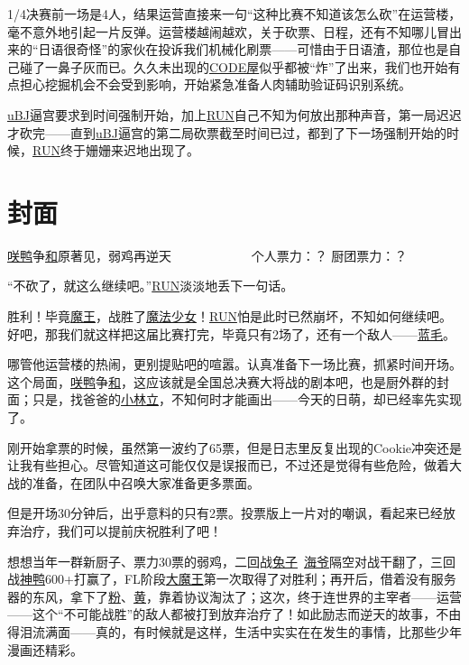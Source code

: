 1/4决赛前一场是4人，结果运营直接来一句“这种比赛不知道该怎么砍”在运营楼，毫不意外地引起一片反弹。运营楼越闹越欢，关于砍票、日程，还有不知哪儿冒出来的“日语很奇怪”的家伙在投诉我们机械化刷票——可惜由于日语渣，那位也是自己碰了一鼻子灰而已。久久未出现的\uline{CODE屋}似乎都被“炸”了出来，我们也开始有点担心挖掘机会不会受到影响，开始紧急准备人肉辅助验证码识别系统。

\uline{uBJ}逼宫要求到时间强制开始，加上\uline{RUN}自己不知为何放出那种声音，第一局迟迟才砍完——直到\uline{uBJ}逼宫的第二局砍票截至时间已过，都到了下一场强制开始的时候，\uline{RUN}终于姗姗来迟地出现了。

\chapter{封面}
\begin{center}
{\subTitle \uline{咲}\uline{鸭}争\uline{和}原著见，弱鸡再逆天}
\subMemo
　　　　　　个人票力：？ 厨团票力：？
\end{center}

“不砍了，就这么继续吧。”\uline{RUN}淡淡地丢下一句话。

胜利！毕竟\uline{魔王}，战胜了\uline{魔法少女}！\uline{RUN}怕是此时已然崩坏，不知如何继续吧。好吧，那我们就这样把这届比赛打完，毕竟只有2场了，还有一个敌人——\uline{蓝毛}。

哪管他运营楼的热闹，更别提贴吧的喧嚣。认真准备下一场比赛，抓紧时间开场。这个局面，\uline{咲}\uline{鸭}争\uline{和}，这应该就是全国总决赛大将战的剧本吧，也是厨外群的封面；只是，找爸爸的\uline{小林立}，不知何时才能画出——今天的日萌，却已经率先实现了。

刚开始拿票的时候，虽然第一波约了65票，但是日志里反复出现的Cookie冲突还是让我有些担心。尽管知道这可能仅仅是误报而已，不过还是觉得有些危险，做着大战的准备，在团队中召唤大家准备更多票面。

但是开场30分钟后，出乎意料的只有2票。投票版上一片对的嘲讽，看起来已经放弃治疗，我们可以提前庆祝胜利了吧！

想想当年一群新厨子、票力30票的弱鸡，二回战\uline{兔子}~\uline{海爷}隔空对战干翻了，三回战\uline{神鸭}600+打赢了，FL阶段\uline{大魔王}第一次取得了对胜利；再开后，借着没有服务器的东风，拿下了\uline{粉}、\uline{黄}，靠着协议淘汰了；这次，终于连世界的主宰者——运营——这个“不可能战胜”的敌人都被打到放弃治疗了！如此励志而逆天的故事，不由得泪流满面——真的，有时候就是这样，生活中实实在在发生的事情，比那些少年漫画还精彩。

